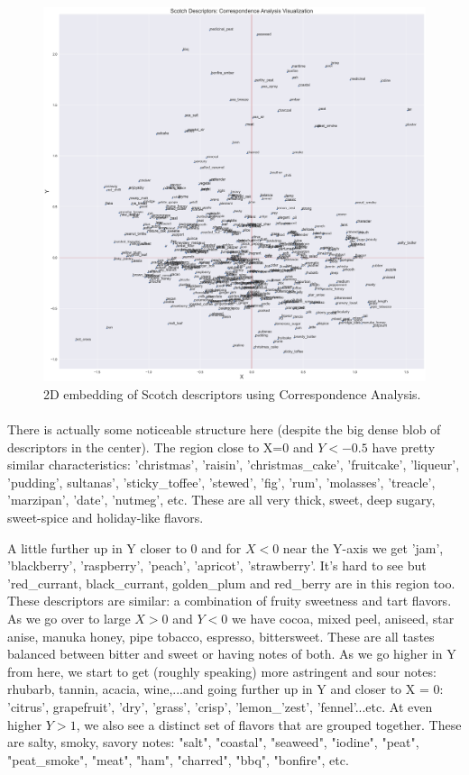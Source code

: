 \documentclass{article}
\begin{document}
		 	 \begin{figure}[H]
		\begin{center}
			\includegraphics[totalheight=14cm]{../images/EDA/CA_word_embed.jpg}
		\end{center}
		\caption{2D embedding of Scotch descriptors using Correspondence Analysis.}
	\end{figure}
\paragraph{} There is actually some noticeable structure here (despite the big dense blob of descriptors in the center). The region close to X=0 and $Y< -0.5$ have pretty similar characteristics: 'christmas', 'raisin', 'christmas\_cake', 'fruitcake', 'liqueur', 'pudding', sultanas', 'sticky\_toffee', 'stewed', 'fig', 'rum', 'molasses', 'treacle', 'marzipan', 'date', 'nutmeg', etc. These are all very thick, sweet, deep sugary, sweet-spice and holiday-like flavors.

A little further up in Y closer to 0 and for $X < 0$ near the Y-axis we get 'jam', 'blackberry', 'raspberry', 'peach', 'apricot', 'strawberry'. It's hard to see but 'red\_currant, black\_currant, golden\_plum and red\_berry are in this region too. These descriptors are similar: a combination of fruity sweetness and tart flavors. As we go over to large $X > 0$ and $Y<0$ we have cocoa, mixed peel, aniseed, star anise, manuka honey, pipe tobacco, espresso, bittersweet. These are all tastes balanced between bitter and sweet or having notes of both. As we go higher in Y from here, we start to get (roughly speaking) more astringent and sour notes: rhubarb, tannin, acacia, wine,...and going further up in Y and closer to X = 0: 'citrus', grapefruit', 'dry', 'grass', 'crisp', 'lemon\_'zest', 'fennel'...etc. At even higher $Y > 1$, we also see a distinct set of flavors that are grouped together. These are salty, smoky, savory notes: "salt", "coastal", "seaweed", "iodine", "peat", "peat\_smoke", "meat", "ham", "charred", "bbq", "bonfire", etc. 
\end{document}
